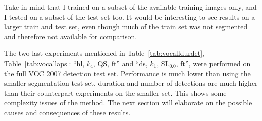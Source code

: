 Take in mind that I trained on a subset of the available training images only, and I tested on a subset of the test set too. It would be interesting to see results on a larger train and test set, even though much of the train set was not segmented and therefore not available for comparison.

The two last experiments mentioned in Table~\ref{tab:vocalldurdet}, Table~\ref{tab:vocallaps}: ``hl, $k_4$, QS, ft'' and ``ds, $k_1$, SL$_{0.0}$, ft'',  were performed on the full VOC 2007 detection test set. Performance is much lower than using the smaller segmentation test set, duration and number of detections are much higher than their counterpart experiments on the smaller set. This shows some complexity issues of the method. The next section will elaborate on the possible causes and consequences of these results.




